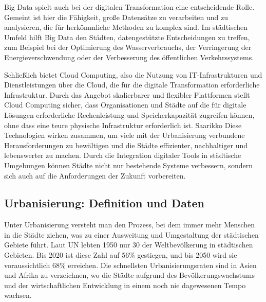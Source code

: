 \documentclass[conference,compsoc,final,a4paper, onecolumn, 11pt]{IEEEtran}
\begin{document}
Big Data spielt auch bei der digitalen Transformation eine entscheidende Rolle. 
Gemeint ist hier die Fähigkeit, große Datensätze zu verarbeiten und zu analysieren, die für herkömmliche Methoden zu komplex sind. 
Im städtischen Umfeld hilft Big Data den Städten, datengestützte Entscheidungen zu treffen, zum Beispiel bei der Optimierung des Wasserverbrauchs, der Verringerung der Energieverschwendung oder der Verbesserung des öffentlichen Verkehrssystems. \autocite{ma_role_2024}

Schließlich bietet Cloud Computing, also die Nutzung von IT-Infrastrukturen und Dienstleistungen über die Cloud, die für die digitale Transformation erforderliche Infrastruktur. 
Durch das Angebot skalierbarer und flexibler Plattformen stellt Cloud Computing sicher, dass Organisationen und Städte auf die für digitale Lösungen erforderliche Rechenleistung und Speicherkapazität zugreifen können, ohne dass eine teure physische Infrastruktur erforderlich ist. 
Saarikko 
Diese Technologien wirken zusammen, um viele mit der Urbanisierung verbundene Herausforderungen zu bewältigen und die Städte effizienter, nachhaltiger und lebenswerter zu machen. 
Durch die Integration digitaler Tools in städtische Umgebungen können Städte nicht nur bestehende Systeme verbessern, sondern sich auch auf die Anforderungen der Zukunft vorbereiten.


\subsection{Urbanisierung: Definition und Daten}
Unter Urbanisierung versteht man den Prozess, bei dem immer mehr Menschen in die Städte ziehen, was zu einer Ausweitung und Umgestaltung der städtischen Gebiete führt. 
Laut \ac{UN} lebten 1950 nur 30 der Weltbevölkerung in städtischen Gebieten. 
Bis 2020 ist diese Zahl auf 56\% gestiegen, und bis 2050 wird sie voraussichtlich 68\% erreichen. 
Die schnellsten Urbanisierungsraten sind in Asien und Afrika zu verzeichnen, wo die Städte aufgrund des Bevölkerungswachstums und der wirtschaftlichen Entwicklung in einem noch nie dagewesenen Tempo wachsen. \autocite[S. 6f]{Taubenbock2015-pj}

\end{document}
